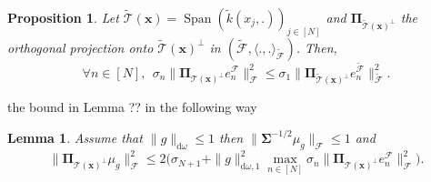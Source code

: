 \documentclass[twoside,11pt]{book}
\newtheorem{proposition}{Proposition}
\newtheorem{lemma}{Lemma}
\numberwithin{theorem}{chapter}
\numberwithin{definition}{chapter}
\numberwithin{proposition}{chapter}
\numberwithin{corollary}{chapter}
\numberwithin{example}{chapter}
\numberwithin{lemma}{chapter}
\numberwithin{assumption}{chapter}
\DeclareMathOperator{\Span}{\mathrm{Span}}
\DeclareMathOperator{\DPP}{\mathrm{DPP}}
\DeclareMathOperator{\EX}{\mathbb{E}}
\begin{document}

\begin{proposition}\label{prop:strong_kernel_perturbation_inequality}
Let $ \tilde{\mathcal{T}}(\bm{x}) = \Span \left( \tilde{k}(x_{j},.) \right)_{j \in [N]}$ and $\bm{\Pi}_{\tilde{\mathcal{T}}(\bm{x})^{\perp}}$ the orthogonal projection onto $\tilde{\mathcal{T}}(\bm{x})^{\perp}$ in $(\tilde{\mathcal{F}}, \langle .,.\rangle_{\tilde{\mathcal{F}}})$. Then,
\begin{equation}\label{eq:kernel_perturbation_inequality}
	\forall n \in [N], \:\: \sigma_{n} \|\bm{\Pi}_{\mathcal{T}(\bm{x})^{\perp}} e_{n}^{\mathcal{F}}\|_{\mathcal{F}}^{2} \leq \sigma_{1}   \|\bm{\Pi}_{\tilde{\mathcal{T}}(\bm{x})^{\perp}} e_{n}^{\tilde{\mathcal{F}}}\|_{\tilde{\mathcal{F}}}^{2}.
\end{equation}
\end{proposition}


the bound in Lemma ?? in the following way



\begin{lemma}\label{lemma:strong_approximation_error_spectral_bound}
Assume that $\|g\|_{\mathrm{d}\omega} \leq 1$ then $\| \bm{\Sigma}^{-1/2} \mu_{g} \|_{\mathcal{F}} \leq 1$ and
\begin{equation}
	\|\bm{\Pi}_{\mathcal{T}(\bm{x})^{\perp}}\mu_{g}\|^{2}_{\mathcal{F}} \leq 2 \bigg( \sigma_{N+1} + \|g\|_{\mathrm{d}\omega,1}^2  \max\limits_{ n \in [N]} \sigma_{n}\|\bm{\Pi}_{\mathcal{T}(\bm{x})^{\perp}} e_{n}^{\mathcal{F}}\|_{\mathcal{F}}^{2} \bigg) .
\label{e:boundingOrthogonalProjection}
\end{equation}
\end{lemma}
\end{document}

